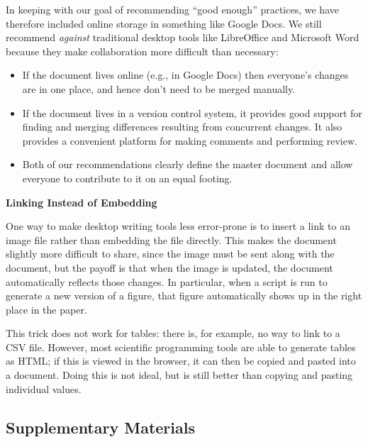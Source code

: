 \documentclass[10pt]{article}
\begin{document}
In keeping with our goal of recommending ``good enough'' practices, we
have therefore included online storage in something like Google
Docs. We still recommend \emph{against} traditional desktop tools like
LibreOffice and Microsoft Word because they make collaboration more
difficult than necessary:

\begin{itemize}

\item
  If the document lives online (e.g., in Google Docs) then everyone's
  changes are in one place, and hence don't need to be merged
  manually.

\item
  If the document lives in a version control system, it provides good
  support for finding and merging differences resulting from
  concurrent changes. It also provides a convenient platform for
  making comments and performing review.

\item
  Both of our recommendations clearly define the master document and
  allow everyone to contribute to it on an equal footing.

\end{itemize}

\begin{framed}
  \noindent \textbf{Linking Instead of Embedding}

  One way to make desktop writing tools less error-prone is to insert
  a link to an image file rather than embedding the file directly.
  This makes the document slightly more difficult to share, since the
  image must be sent along with the document, but the payoff is that
  when the image is updated, the document automatically reflects those
  changes.  In particular, when a script is run to generate a new
  version of a figure, that figure automatically shows up in the right
  place in the paper.

  This trick does not work for tables: there is, for example, no way
  to link to a CSV file.  However, most scientific programming tools
  are able to generate tables as HTML; if this is viewed in the
  browser, it can then be copied and pasted into a document.  Doing
  this is not ideal, but is still better than copying and pasting
  individual values.
\end{framed}

\subsection*{Supplementary Materials}
\end{document}
